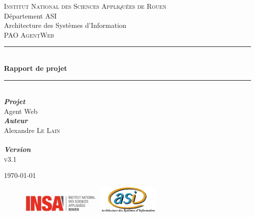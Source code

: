 \documentclass[11pt,dvipsnames,svgnames]{report}
\begin{document}
\begin{titlepage}
\newcommand{\HRule}{\rule{\linewidth}{0.5mm}} 
\center 
{}\textsc{\huge Institut National des Sciences Appliquées de Rouen}\\[0.7cm] 
\LARGE Département ASI~\\[0.5cm]
\Large{Architecture des Systèmes d'Information} ~\\[1.5cm]
\textsc{\Large PAO AgentWeb}\\[0.5cm] 

\HRule \\[0.4cm]
{ \huge \bfseries Rapport de projet}\\[0.18cm] \HRule \\[1.5cm]
 
\LARGE \emph{\textbf{Projet}} \\
{Agent Web}\\[1.3cm]

\large
	\emph{\textbf{Auteur}}\\
	Alexandre \textsc{Le Lain}\\[0.3cm]
	
~\\[0.5cm]
\Large \emph{\textbf{Version}}\\
	\textsc{v3.1}

\vfill{\today} 

\begin{figure}
\includegraphics[width=4cm]{images/LogoINSA.png}\hfill
\includegraphics[width=3cm]{images/logoasi.png}
\end{figure}


 \end{titlepage}
\end{document}
